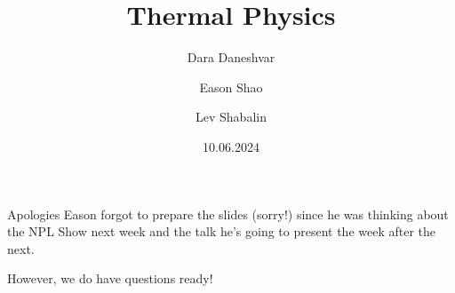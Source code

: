\documentclass{beamer}
\title[Thermal Physics]{Thermal Physics}
\author{Dara Daneshvar \and Eason Shao \and Lev Shabalin}
\institute[]{Physics Problem Solving Society\\St Paul's School}
\date{10.06.2024}
\begin{document}
    \frame{\titlepage}
    
    \begin{frame}{Apologies}
        Eason forgot to prepare the slides (sorry!) since he was thinking about the NPL Show next week and the talk he's going to present the week after the next.\pause

        However, we do have questions ready!
    \end{frame}
    
\end{document}
